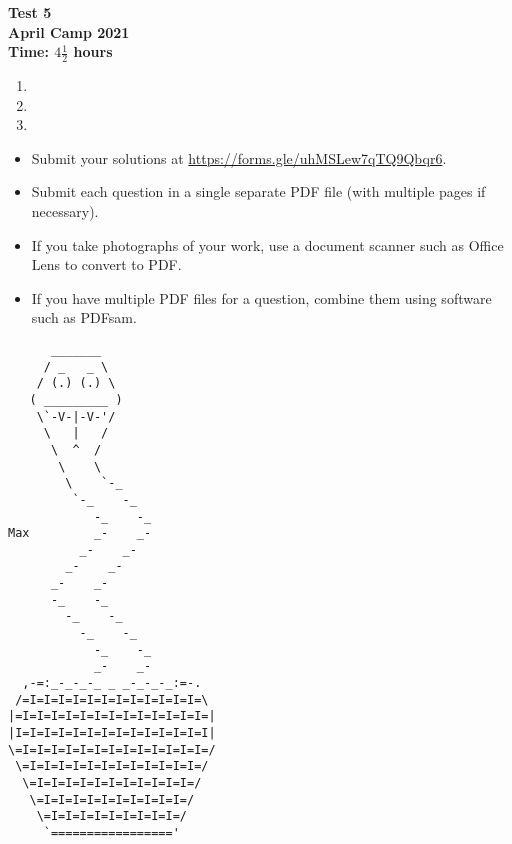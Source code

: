\documentclass{article}
\begin{document}
\thispagestyle{empty}

\begin{center}
  \textbf{\Large Test 5}
  \\ \vspace{1em}
  \textbf{\large April Camp 2021}
  \\ \vspace{1em}
  \textbf{\large Time: $4\frac{1}{2}$ hours}
\end{center}

\vfill

\begin{enumerate}[leftmargin=0pt, itemsep=18pt]

\item


\item


\item

\end{enumerate}


\vfill
\vfill
\begin{itemize}
	\item Submit your solutions at \url{https://forms.gle/uhMSLew7qTQ9Qbqr6}.
	\item Submit each question in a single separate PDF file (with multiple pages if necessary).
	\item If you take photographs of your work, use a document scanner such as Office Lens to convert to PDF.
	\item If you have multiple PDF files for a question, combine them using software such as PDFsam.
\end{itemize}

\vfill
\centering
\begin{BVerbatim}
      _______
     / _   _ \
    / (.) (.) \
   ( _________ )
    \`-V-|-V-'/
     \   |   /
      \  ^  /
       \    \
        \    `-_
         `-_    -_
            -_    -_
Max         _-    _-
          _-    _-
        _-    _-
      _-    _-
      -_    -_
        -_    -_
          -_    -_
            -_    -_
            _-    _-
  ,-=:_-_-_-_ _ _-_-_-_:=-.
 /=I=I=I=I=I=I=I=I=I=I=I=I=\
|=I=I=I=I=I=I=I=I=I=I=I=I=I=|
|I=I=I=I=I=I=I=I=I=I=I=I=I=I|
\=I=I=I=I=I=I=I=I=I=I=I=I=I=/
 \=I=I=I=I=I=I=I=I=I=I=I=I=/
  \=I=I=I=I=I=I=I=I=I=I=I=/
   \=I=I=I=I=I=I=I=I=I=I=/
    \=I=I=I=I=I=I=I=I=I=/
     `================='
\end{BVerbatim}
\end{document}
